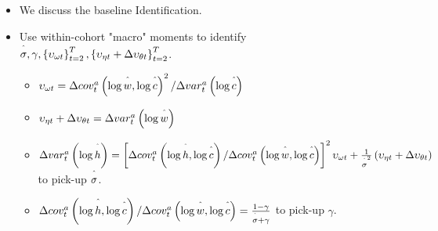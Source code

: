 \documentclass[notes=show]{beamer}
\begin{document}
\begin{frame}%



\begin{itemize}
\item We discuss the baseline Identification.

\item Use within-cohort "macro" moments to identify $\overset{\symbol{94}}{%
\sigma },\gamma ,\left\{ \upsilon _{\omega t}\right\} _{t=2}^{T},\left\{
\upsilon _{\eta t}+\Delta \upsilon _{\theta t}\right\} _{t=2}^{T}$.

\begin{itemize}
\item $\upsilon _{\omega t}=\Delta cov_{t}^{a}\left( \log \overset{\symbol{94%
}}{w},\log \overset{\symbol{94}}{c}\right) ^{2}/\Delta var_{t}^{a}\left(
\log \overset{\symbol{94}}{c}\right) $

\item $\upsilon _{\eta t}+\Delta \upsilon _{\theta t}=\Delta
var_{t}^{a}\left( \log \overset{\symbol{94}}{w}\right) $

\item $\Delta var_{t}^{a}\left( \log \overset{\symbol{94}}{h}\right) =\left[
\Delta cov_{t}^{a}\left( \log \overset{\symbol{94}}{h},\log \overset{\symbol{%
94}}{c}\right) /\Delta cov_{t}^{a}\left( \log \overset{\symbol{94}}{w},\log 
\overset{\symbol{94}}{c}\right) \right] ^{2}\upsilon _{\omega t}+\frac{1}{%
\overset{\symbol{94}}{\sigma }^{2}}\left( \upsilon _{\eta t}+\Delta \upsilon
_{\theta t}\right) $ to pick-up $\overset{\symbol{94}}{\sigma }$.

\item $\Delta cov_{t}^{a}\left( \log \overset{\symbol{94}}{h},\log \overset{%
\symbol{94}}{c}\right) /\Delta cov_{t}^{a}\left( \log \overset{\symbol{94}}{w%
},\log \overset{\symbol{94}}{c}\right) =\frac{1-\gamma }{\overset{\symbol{94}%
}{\sigma }+\gamma }$ to pick-up $\gamma $.
\end{itemize}
\end{itemize}

\transboxout%
\end{frame}%
\end{document}
